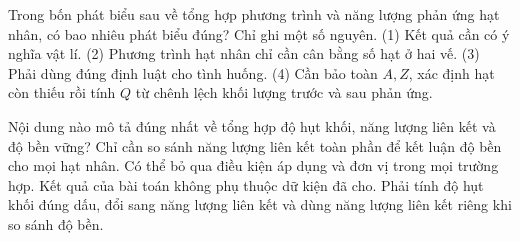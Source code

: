 \begin{ex}
Trong bốn phát biểu sau về tổng hợp phương trình và năng lượng phản ứng hạt nhân, có bao nhiêu phát biểu đúng? Chỉ ghi một số nguyên. (1) Kết quả cần có ý nghĩa vật lí. (2) Phương trình hạt nhân chỉ cần cân bằng số hạt ở hai vế. (3) Phải dùng đúng định luật cho tình huống. (4) Cần bảo toàn $A,Z$, xác định hạt còn thiếu rồi tính $Q$ từ chênh lệch khối lượng trước và sau phản ứng.
\end{ex}

\begin{ex}
Nội dung nào mô tả đúng nhất về tổng hợp độ hụt khối, năng lượng liên kết và độ bền vững?
\choice
{Chỉ cần so sánh năng lượng liên kết toàn phần để kết luận độ bền cho mọi hạt nhân.}
{Có thể bỏ qua điều kiện áp dụng và đơn vị trong mọi trường hợp.}
{Kết quả của bài toán không phụ thuộc dữ kiện đã cho.}
{\True Phải tính độ hụt khối đúng dấu, đổi sang năng lượng liên kết và dùng năng lượng liên kết riêng khi so sánh độ bền.}
\end{ex}

